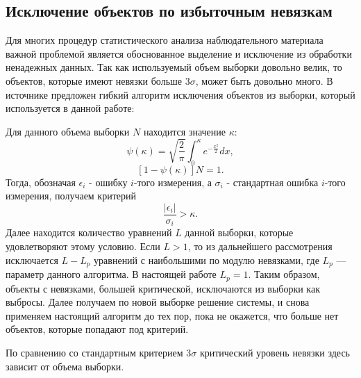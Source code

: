 \documentclass{matmex-diploma-custom}
\begin{document}
\subsection{Исключение объектов по избыточным невязкам} \label{err_filter}
Для многих процедур статистического анализа наблюдательного материала важной проблемой является обоснованное выделение и исключение из обработки ненадежных данных. Так как используемый объем выборки довольно велик, то объектов, которые имеют невязки больше $3\sigma$, может быть довольно много. В источнике \cite{NIIE} предложен гибкий алгоритм исключения объектов из выборки, который используется в данной работе:

\par Для данного объема выборки $N$ находится значение $\kappa$:
\begin{equation}
\psi (\kappa) = \sqrt{\frac{2}{\pi}} \int_0^{\kappa} e^{- \frac{x^2}{2}} dx,
\end{equation}
\begin{equation}
\left[ 1 - \psi (\kappa) \right] N = 1.
\end{equation}
Тогда, обозначая $\epsilon_i$ - ошибку $i$-того измерения, а $\sigma_i$ - стандартная ошибка $i$-того измерения, получаем критерий
\begin{equation} \label{criteria}
\frac{\left| \epsilon_i \right|}{\sigma_i} > \kappa.
\end{equation}
Далее находится количество уравнений $L$ данной выборки, которые удовлетворяют этому условию. Если $L > 1$, то из дальнейшего рассмотрения исключается $L - L_p$ уравнений с наибольшими по модулю невязками, где $L_p$ — параметр данного алгоритма.  В настоящей работе $L_p = 1$. Таким образом, объекты с невязками, большей критической, исключаются из выборки как выбросы. Далее получаем по новой выборке решение системы, и снова применяем настоящий алгоритм до тех пор, пока не окажется, что больше нет объектов, которые попадают под критерий.
\par По сравнению со стандартным критерием $3\sigma$ критический уровень невязки здесь зависит от объема выборки.
\end{document}
